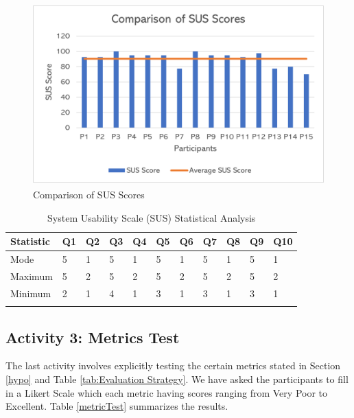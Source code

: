 \begin{figure}[H]
    \centering
    \includegraphics[height=7cm]{Images/SUSScore.png}
    \caption{Comparison of SUS Scores}
    \label{fig:susScore}
    \end{figure}
\begin{longtable}{| p{} | p{} | p{} | p{} | p{} | p{} | p{} | p{} | p{} | p{} | p{} |} 
    \hline
    		\textbf{Statistic}    &\textbf{Q1}    &\textbf{Q2}    &\textbf{Q3}    &\textbf{Q4}    &\textbf{Q5}    &\textbf{Q6}   &\textbf{Q7}    &\textbf{Q8}    &\textbf{Q9}    &\textbf{Q10}   
\\\hline
Mode        &5   &1   &5   &1   &5   &1   &5   &1   &5   & 1 
\\\hline
Maximum     &5   &2   &5   &2   &5   &2   &5   &2   &5   &2  
\\\hline
Minimum     &2   &1   &4   &1   &3   &1   &3   &1   &3   &1  
\\\hline
\caption{System Usability Scale (SUS) Statistical Analysis} \label{susStats}
\end{longtable}

\subsection{Activity 3: Metrics Test}

The last activity involves explicitly testing the certain metrics stated in Section \ref{hypo} and Table \ref{tab:Evaluation Strategy}. We have asked the participants to fill in a Likert Scale which each metric having scores ranging from Very Poor to Excellent. Table \ref{metricTest} summarizes the results. 

